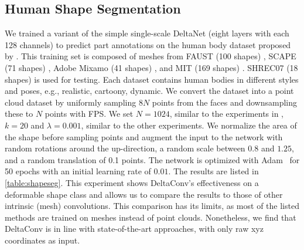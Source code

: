 \documentclass[acmtog, authorversion]{acmart}
\begin{document}
\subsection{Human Shape Segmentation}
We trained a variant of the simple single-scale DeltaNet (eight layers with each 128 channels) to predict part annotations on the human body dataset proposed by \citet{maron2017convolutional}. This training set is composed of meshes from FAUST (100 shapes) \cite{faust2014}, SCAPE (71 shapes) \cite{scape2005}, Adobe Mixamo (41 shapes) \cite{adobe_2016}, and MIT (169 shapes) \cite{mit2008}. SHREC07 (18 shapes) is used for testing. Each dataset contains human bodies in different styles and poses, e.g., realistic, cartoony, dynamic. We convert the dataset into a point cloud dataset by uniformly sampling $8N$ points from the faces and downsampling these to $N$ points with FPS. We set $N=1024$, similar to the experiments in \citet{Wiersma2020}, $k=20$ and $\lambda=0.001$, similar to the other experiments. We normalize the area of the shape before sampling points and augment the input to the network with random rotations around the up-direction, a random scale between $0.8$ and $1.25$, and a random translation of 0.1 points. The network is optimized with Adam~\cite{adamkingma} for 50 epochs with an initial learning rate of $0.01$. The results are listed in \autoref{table:shapeseg}. This experiment shows DeltaConv's effectiveness on a deformable shape class and allows us to compare the results to those of other intrinsic (mesh) convolutions. This comparison has its limits, as most of the listed methods are trained on meshes instead of point clouds. Nonetheless, we find that DeltaConv is in line with state-of-the-art approaches, with only raw xyz coordinates as input.
 
\end{document}
